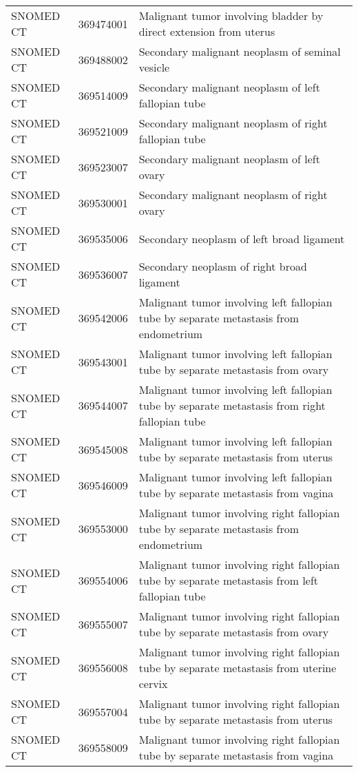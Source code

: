 \begin{longtable}{p{}p{}p{}}
  SNOMED CT & 369474001 & Malignant tumor involving bladder by direct extension from uterus \\ 
  SNOMED CT & 369488002 & Secondary malignant neoplasm of seminal vesicle \\ 
  SNOMED CT & 369514009 & Secondary malignant neoplasm of left fallopian tube \\ 
  SNOMED CT & 369521009 & Secondary malignant neoplasm of right fallopian tube \\ 
  SNOMED CT & 369523007 & Secondary malignant neoplasm of left ovary \\ 
  SNOMED CT & 369530001 & Secondary malignant neoplasm of right ovary \\ 
  SNOMED CT & 369535006 & Secondary neoplasm of left broad ligament \\ 
  SNOMED CT & 369536007 & Secondary neoplasm of right broad ligament \\ 
  SNOMED CT & 369542006 & Malignant tumor involving left fallopian tube by separate metastasis from endometrium \\ 
  SNOMED CT & 369543001 & Malignant tumor involving left fallopian tube by separate metastasis from ovary \\ 
  SNOMED CT & 369544007 & Malignant tumor involving left fallopian tube by separate metastasis from right fallopian tube \\ 
  SNOMED CT & 369545008 & Malignant tumor involving left fallopian tube by separate metastasis from uterus \\ 
  SNOMED CT & 369546009 & Malignant tumor involving left fallopian tube by separate metastasis from vagina \\ 
  SNOMED CT & 369553000 & Malignant tumor involving right fallopian tube by separate metastasis from endometrium \\ 
  SNOMED CT & 369554006 & Malignant tumor involving right fallopian tube by separate metastasis from left fallopian tube \\ 
  SNOMED CT & 369555007 & Malignant tumor involving right fallopian tube by separate metastasis from ovary \\ 
  SNOMED CT & 369556008 & Malignant tumor involving right fallopian tube by separate metastasis from uterine cervix \\ 
  SNOMED CT & 369557004 & Malignant tumor involving right fallopian tube by separate metastasis from uterus \\ 
  SNOMED CT & 369558009 & Malignant tumor involving right fallopian tube by separate metastasis from vagina \\ 

\end{longtable}

